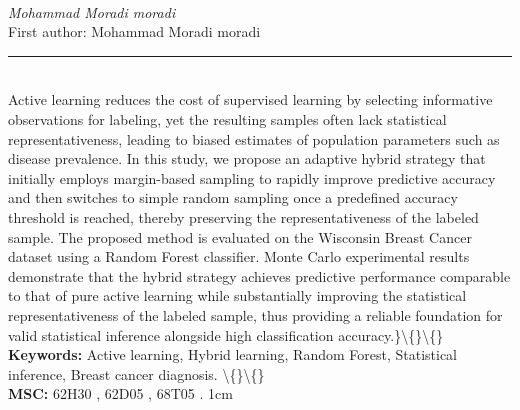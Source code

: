 \documentclass[10pt,twoside]{article}
\begin{document}
\noindent\begin{minipage}[t][\textheight]{\textwidth}
\\[0.35em]
{\itshape Mohammad Moradi moradi}\\[0.2em]
{\footnotesize First author: Mohammad Moradi moradi}\\[0.45em]
\noindent\rule{\textwidth}{0.3pt}\\[0.4em]
{\footnotesize Active learning reduces the cost of supervised learning by selecting informative observations for labeling, yet the resulting samples often lack statistical representativeness, leading to biased estimates of population parameters such as disease prevalence. In this study, we propose an adaptive hybrid strategy that initially employs margin-based sampling to rapidly improve predictive accuracy and then switches to simple random sampling once a predefined accuracy threshold is reached, thereby preserving the representativeness of the labeled sample. The proposed method is evaluated on the Wisconsin Breast Cancer dataset using a Random Forest classifier. Monte Carlo experimental results demonstrate that the hybrid strategy achieves predictive performance comparable to that of pure active learning while substantially improving the statistical representativeness of the labeled sample, thus providing a reliable foundation for valid statistical inference alongside high classification accuracy.\}\textbackslash\{\}\textbackslash\{\}}\\[0.4em]
{\footnotesize\bfseries Keywords:} {\footnotesize Active learning, Hybrid learning, Random Forest, Statistical inference, Breast cancer diagnosis. \textbackslash\{\}\textbackslash\{\}}\\[0.15em]
{\footnotesize\bfseries MSC:} {\footnotesize 62H30 , 62D05 , 68T05 . 1cm}\\
\vfill
\end{minipage}
\newpage
\end{document}
